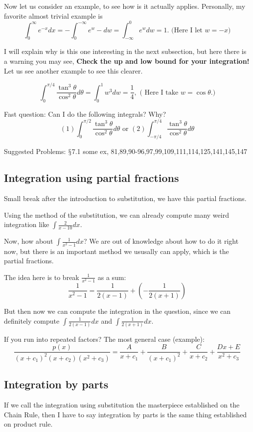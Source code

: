 \documentclass[12pt]{article}
\theoremstyle{definition}
\theoremstyle{definition}
\theoremstyle{remark}
\theoremstyle{definition}
\theoremstyle{definition}
\theoremstyle{definition}
\begin{document}
Now let us consider an example, to see how is it actually applies.
Personally, my favorite almost trivial example is \[\int^{\infty}_0 e^{-x}dx=-\int_{0}^{-\infty}e^w -dw=\int^{0}_{-\infty}e^w dw=1.\text{ (Here I let }w=-x)\]

I will explain why is this one interesting in the next subsection, but here there is a warning you may see, \textbf{Check the up and low bound for your integration!} Let us see another example to see this clearer.

\[\int_{0}^{\pi/4}\frac{\tan^3 \theta}{\cos^2 \theta}d \theta = \int_{0}^{1}w^3dw=\frac{1}{4},\text{ ( Here I take } w = \cos \theta.)\]

Fast question: Can I do the following integrals? Why?$$(1) \int_{0}^{\pi/2}\frac{\tan^3 \theta}{\cos^2 \theta}d \theta  \text{ or } (2)\int_{-\pi/4}^{\pi/4}\frac{\tan^3 \theta}{\cos^2 \theta}d \theta$$


Suggested Problems: $\mathsection$7.1 some ex, 81,89,90-96,97,99,109,111,114,125,141,145,147

\subsection{Integration using partial fractions}

Small break after the introduction to substitution, we have this partial fractions.

Using the method of the substitution, we can already compute many weird integration like $\int \frac{2}{x-10} dx$.

Now, how about $\int \frac{1}{x^2-1} dx$? We are out of knowledge about how to do it right now, but there is an important method we ususally can apply, which is the partial fractions. 

The idea here is to break $\frac{1}{x^2-1}$ as a sum: $$\frac{1}{x^2-1}=\frac{1}{2(x-1) }+(-\frac{1}{2(x+1)})$$

But then now we can compute the integration in the question, since we can definitely compute $\int \frac{1}{2(x-1) } dx$ and $\int \frac{1}{2(x+1) }dx$.

If you run into repeated factors? The most general case (example): $$\frac{p(x)}{(x+c_1)^2(x+c_2)(x^2+c_3)}=\frac{A}{x+c_1}+\frac{B}{(x+c_1)^2}+\frac{C}{x+c_2}+ \frac{Dx+E}{x^2+c_3}$$


\subsection{Integration by parts}
If we call the integration using substitution the masterpiece established on the Chain Rule, then I have to say integration by parts is the same thing established on product rule.
\end{document}
